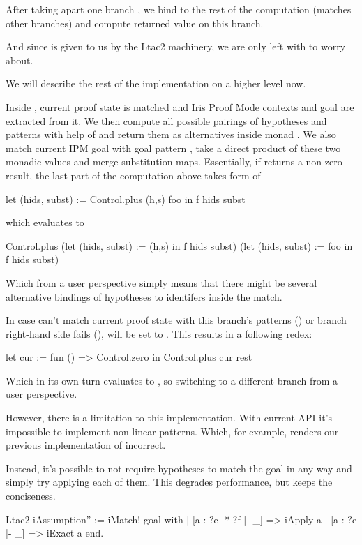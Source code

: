 After taking apart one branch , we bind  to the rest of the computation (matches other branches) and compute returned value on this branch.

And since  is given to us by the Ltac2 machinery, we are only left with  to worry about.

We will describe the rest of the implementation on a higher level now.

Inside , current proof state is matched and Iris Proof Mode contexts and goal are extracted from it.
We then compute all possible pairings of hypotheses and patterns with help of  and return them as alternatives inside monad .
We also match current IPM goal with goal pattern , take a direct product of these two monadic values and merge substitution maps.
Essentially, if  returns a non-zero result, the last part of the computation above takes form of
\begin{coq}
let (hids, subst) := Control.plus (h,s) foo in
f hids subst
\end{coq}
which evaluates to
\begin{coq}
Control.plus
  (let (hids, subst) := (h,s) in
    f hids subst)
  (let (hids, subst) := foo in
   f hids subst)
\end{coq}

Which from a user perspective simply means that there might be several alternative bindings of hypotheses to identifers inside the match.

In case  can't match current proof state with this branch's patterns () or branch right-hand side fails (),  will be set to .
This results in a following redex:
\begin{coq}
let cur := fun () => Control.zero
in Control.plus cur rest
\end{coq}
Which in its own turn evaluates to , so switching to a different branch from a user perspective.

However, there is a limitation to this implementation.
With current API it's impossible to implement non-linear patterns.
Which, for example, renders our previous implementation of  incorrect.

Instead, it's possible to not require hypotheses to match the goal in any way and simply try applying each of them.
This degrades performance, but keeps the conciseness.
\begin{minipage}{\linewidth}
\begin{coq}
Ltac2 iAssumption'' :=
  iMatch! goal with
  | [a : ?e -* ?f |- _] => iApply a
  | [a : ?e |- _] => iExact a
  end.
\end{coq}
\end{minipage}

